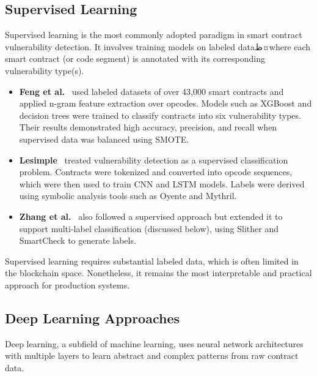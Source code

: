 \subsection*{Supervised Learning}
Supervised learning is the most commonly adopted paradigm in smart contract vulnerability detection. It involves training models on labeled dataظ¤where each smart contract (or code segment) is annotated with its corresponding vulnerability type(s).

\begin{itemize}
    \item \textbf{Feng et al.}~\cite{feng2024interpretable} used labeled datasets of over 43,000 smart contracts and applied n-gram feature extraction over opcodes. Models such as XGBoost and decision trees were trained to classify contracts into six vulnerability types. Their results demonstrated high accuracy, precision, and recall when supervised data was balanced using SMOTE.
    
    \item \textbf{Lesimple}~\cite{lesimple2020master} treated vulnerability detection as a supervised classification problem. Contracts were tokenized and converted into opcode sequences, which were then used to train CNN and LSTM models. Labels were derived using symbolic analysis tools such as Oyente and Mythril.
    
    \item \textbf{Zhang et al.}~\cite{zhang2020scvd} also followed a supervised approach but extended it to support multi-label classification (discussed below), using Slither and SmartCheck to generate labels.
\end{itemize}

Supervised learning requires substantial labeled data, which is often limited in the blockchain space. Nonetheless, it remains the most interpretable and practical approach for production systems.

\subsection*{Deep Learning Approaches}

Deep learning, a subfield of machine learning, uses neural network architectures with multiple layers to learn abstract and complex patterns from raw contract data.

